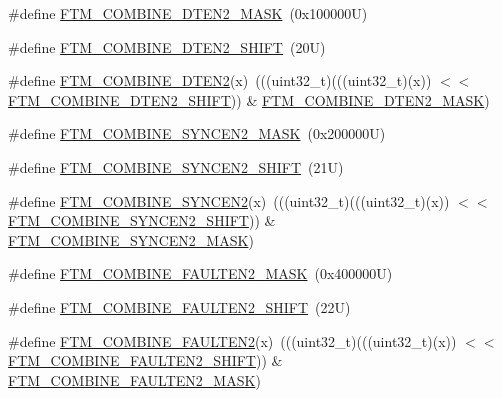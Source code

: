 \begin{DoxyCompactItemize}
\item 
\#define \mbox{\hyperlink{group___f_t_m___register___masks_gadd286edd7ecc4625be042f1583ea8a74}{F\+T\+M\+\_\+\+C\+O\+M\+B\+I\+N\+E\+\_\+\+D\+T\+E\+N2\+\_\+\+M\+A\+SK}}~(0x100000\+U)
\item 
\#define \mbox{\hyperlink{group___f_t_m___register___masks_ga46657f8744aea437178eb9de3a25b0ff}{F\+T\+M\+\_\+\+C\+O\+M\+B\+I\+N\+E\+\_\+\+D\+T\+E\+N2\+\_\+\+S\+H\+I\+FT}}~(20\+U)
\item 
\#define \mbox{\hyperlink{group___f_t_m___register___masks_gaa483e9e7320045ff6f31699c875a0ca1}{F\+T\+M\+\_\+\+C\+O\+M\+B\+I\+N\+E\+\_\+\+D\+T\+E\+N2}}(x)~(((uint32\+\_\+t)(((uint32\+\_\+t)(x)) $<$$<$ \mbox{\hyperlink{group___f_t_m___register___masks_ga46657f8744aea437178eb9de3a25b0ff}{F\+T\+M\+\_\+\+C\+O\+M\+B\+I\+N\+E\+\_\+\+D\+T\+E\+N2\+\_\+\+S\+H\+I\+FT}})) \& \mbox{\hyperlink{group___f_t_m___register___masks_gadd286edd7ecc4625be042f1583ea8a74}{F\+T\+M\+\_\+\+C\+O\+M\+B\+I\+N\+E\+\_\+\+D\+T\+E\+N2\+\_\+\+M\+A\+SK}})
\item 
\#define \mbox{\hyperlink{group___f_t_m___register___masks_ga9b171aec492022bb55593f6bfae038da}{F\+T\+M\+\_\+\+C\+O\+M\+B\+I\+N\+E\+\_\+\+S\+Y\+N\+C\+E\+N2\+\_\+\+M\+A\+SK}}~(0x200000\+U)
\item 
\#define \mbox{\hyperlink{group___f_t_m___register___masks_ga64914009d95ebee18e191655129c2c07}{F\+T\+M\+\_\+\+C\+O\+M\+B\+I\+N\+E\+\_\+\+S\+Y\+N\+C\+E\+N2\+\_\+\+S\+H\+I\+FT}}~(21\+U)
\item 
\#define \mbox{\hyperlink{group___f_t_m___register___masks_ga8984672015cf9be29a7a87d831b11e42}{F\+T\+M\+\_\+\+C\+O\+M\+B\+I\+N\+E\+\_\+\+S\+Y\+N\+C\+E\+N2}}(x)~(((uint32\+\_\+t)(((uint32\+\_\+t)(x)) $<$$<$ \mbox{\hyperlink{group___f_t_m___register___masks_ga64914009d95ebee18e191655129c2c07}{F\+T\+M\+\_\+\+C\+O\+M\+B\+I\+N\+E\+\_\+\+S\+Y\+N\+C\+E\+N2\+\_\+\+S\+H\+I\+FT}})) \& \mbox{\hyperlink{group___f_t_m___register___masks_ga9b171aec492022bb55593f6bfae038da}{F\+T\+M\+\_\+\+C\+O\+M\+B\+I\+N\+E\+\_\+\+S\+Y\+N\+C\+E\+N2\+\_\+\+M\+A\+SK}})
\item 
\#define \mbox{\hyperlink{group___f_t_m___register___masks_gad67706e653caa0da6a85514ebd5d2fc7}{F\+T\+M\+\_\+\+C\+O\+M\+B\+I\+N\+E\+\_\+\+F\+A\+U\+L\+T\+E\+N2\+\_\+\+M\+A\+SK}}~(0x400000\+U)
\item 
\#define \mbox{\hyperlink{group___f_t_m___register___masks_ga35ee8ad9a6f4e07fa058735b7807e0a8}{F\+T\+M\+\_\+\+C\+O\+M\+B\+I\+N\+E\+\_\+\+F\+A\+U\+L\+T\+E\+N2\+\_\+\+S\+H\+I\+FT}}~(22\+U)
\item 
\#define \mbox{\hyperlink{group___f_t_m___register___masks_gabfa4413da2e92513679bbf35c329a267}{F\+T\+M\+\_\+\+C\+O\+M\+B\+I\+N\+E\+\_\+\+F\+A\+U\+L\+T\+E\+N2}}(x)~(((uint32\+\_\+t)(((uint32\+\_\+t)(x)) $<$$<$ \mbox{\hyperlink{group___f_t_m___register___masks_ga35ee8ad9a6f4e07fa058735b7807e0a8}{F\+T\+M\+\_\+\+C\+O\+M\+B\+I\+N\+E\+\_\+\+F\+A\+U\+L\+T\+E\+N2\+\_\+\+S\+H\+I\+FT}})) \& \mbox{\hyperlink{group___f_t_m___register___masks_gad67706e653caa0da6a85514ebd5d2fc7}{F\+T\+M\+\_\+\+C\+O\+M\+B\+I\+N\+E\+\_\+\+F\+A\+U\+L\+T\+E\+N2\+\_\+\+M\+A\+SK}})
$$
\end{DoxyCompactItemize}
